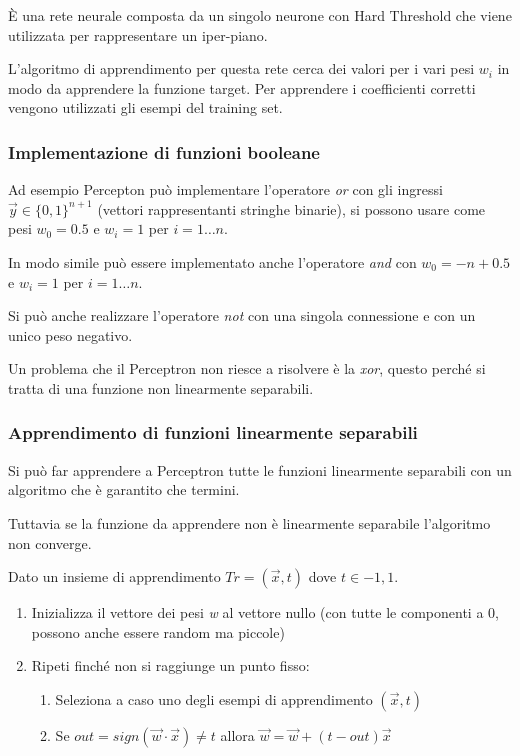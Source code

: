 È una rete neurale composta da un singolo neurone con Hard Threshold che
viene utilizzata per rappresentare un iper-piano.

L'algoritmo di apprendimento per questa rete cerca dei valori per i vari
pesi $w_i$ in modo da apprendere la funzione target. Per apprendere
i coefficienti corretti vengono utilizzati gli esempi del training set.

\subsubsection{Implementazione di funzioni booleane}\label{implementazione-di-funzioni-booleane}

Ad esempio Percepton può implementare l'operatore \emph{or} con gli
ingressi $\vec{y} \in \{0,1\}^{n+1}$ (vettori rappresentanti stringhe
binarie), si possono usare come pesi $w_0 = 0.5$ e $w_i = 1$
per $i = 1 \ldots n$.

In modo simile può essere implementato anche l'operatore \emph{and} con
$w_0 = -n+0.5$ e $w_i = 1$ per $i = 1 \ldots n$.

Si può anche realizzare l'operatore \emph{not} con una singola
connessione e con un unico peso negativo.

Un problema che il Perceptron non riesce a risolvere è la \emph{xor},
questo perché si tratta di una funzione non linearmente separabili.

\subsubsection{Apprendimento di funzioni linearmente separabili}\label{apprendimento-di-funzioni-linearmente-separabili}

Si può far apprendere a Perceptron tutte le funzioni linearmente
separabili con un algoritmo che è garantito che termini.

Tuttavia se la funzione da apprendere non è linearmente separabile
l'algoritmo non converge.

Dato un insieme di apprendimento $Tr = {(\vec{x},t)}$ dove $t \in {-1,1}$.

\begin{enumerate}
\item
  Inizializza il vettore dei pesi \emph{w} al vettore nullo (con tutte
  le componenti a 0, possono anche essere random ma piccole)
\item
  Ripeti finché non si raggiunge un punto fisso:

  \begin{enumerate}
  \item
    Seleziona a caso uno degli esempi di apprendimento $(\vec{x},t)$
  \item
    Se $out = sign(\vec{w} \cdot \vec{x}) \neq t$ allora $\vec{w} = \vec{w} + (t - out)\vec{x}$
  \end{enumerate}
\end{enumerate}

